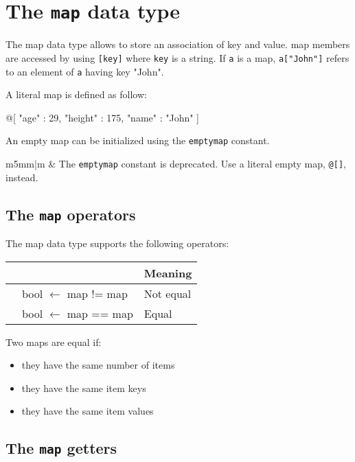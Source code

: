 \documentclass[10pt,openright,twosides]{report}
\newcommand{\gtltype}[1]{{\small\ttfamily #1}}
\newcommand{\scst}[1]{{\footnotesize\ttfamily\colorbox{light-blue}{"#1"}}}
\newcommand{\gtlinline}[1]{\colorbox{light-blue}{\lstinline[language=gtl]{#1}}}
\newcommand\Warning{%
 \makebox[1.4em][c]{%
 \makebox[0pt][c]{\raisebox{-.05em}{\scriptsize!}}%
 \makebox[0pt][c]{\raisebox{-.2em}{\color{red}\Large$\bigtriangleup$}}}}%
\newcommand{\warning}[1]{%
\vspace{1em}
\hspace{-18.3mm}
\rowcolors{1}{white}{light-gray}
\begin{tabular}[b]{m{5mm}|m{\linewidth}}
\Warning & #1\\
\end{tabular}
}
\begin{document}
\section{The \texttt{map} data type}

The \gtltype{map} data type allows to store an association of key and value. \gtltype{map} members are accessed by using \gtlinline{[key]} where \gtlinline{key} is a \gtltype{string}. If \gtlinline{a} is a \gtltype{map}, \gtlinline{a["John"]} refers to an element of \gtlinline{a} having key \scst{John}.

A literal \gtltype{map} is defined as follow:

\begin{gtl}
@[ "age" : 29, "height" : 175, "name" : "John" ]
\end{gtl}

An empty map can be initialized using the \gtlinline{emptymap} constant.

\warning{The \gtlinline{emptymap} constant is deprecated. Use a literal empty map, \gtlinline{@[]}, instead.}


\subsection{The \texttt{map} operators}

The \gtltype{map} data type supports the following operators:

\begin{longtable}{>{\ttfamily}l|>{\ttfamily}l|l}
{\bf Operator}&{\bf Expression type}&{\bf Meaning}\\
\hline\endhead
 {!=}&
  {bool $\leftarrow$ map != map}&
  {Not equal}\\
 {==}&
  {bool $\leftarrow$ map == map}&
  {Equal}\\
\end{longtable}

Two maps are equal if:
\begin{itemize}
\item they have the same number of items
\item they have the same item keys
\item they have the same item values
\end{itemize}


\subsection{The \texttt{map} getters}
\end{document}
